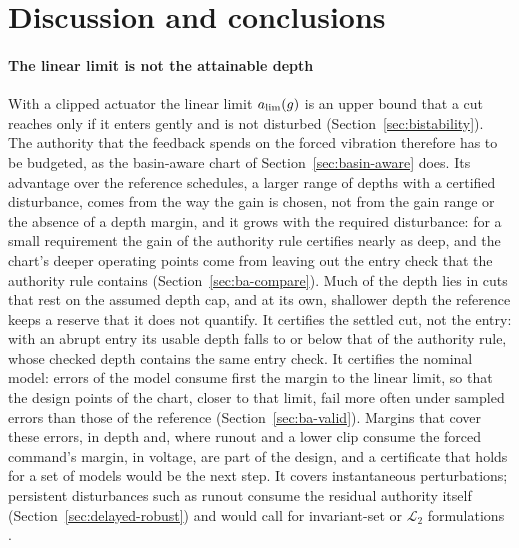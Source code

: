 \section{Discussion and conclusions}\label{sec:discussion}

\paragraph{The linear limit is not the attainable depth}
With a clipped actuator the linear limit $a_{\lim}(g)$ is an upper bound that a cut reaches only if it enters gently and is not disturbed (Section~\ref{sec:bistability}). The authority that the feedback spends on the forced vibration therefore has to be budgeted, as the basin-aware chart of Section~\ref{sec:basin-aware} does. Its advantage over the reference schedules, a larger range of depths with a certified disturbance, comes from the way the gain is chosen, not from the gain range or the absence of a depth margin, and it grows with the required disturbance: for a small requirement the gain of the authority rule certifies nearly as deep, and the chart's deeper operating points come from leaving out the entry check that the authority rule contains (Section~\ref{sec:ba-compare}). Much of the depth lies in cuts that rest on the assumed depth cap, and at its own, shallower depth the reference keeps a reserve that it does not quantify. It certifies the settled cut, not the entry: with an abrupt entry its usable depth falls to or below that of the authority rule, whose checked depth contains the same entry check. It certifies the nominal model: errors of the model consume first the margin to the linear limit, so that the design points of the chart, closer to that limit, fail more often under sampled errors than those of the reference (Section~\ref{sec:ba-valid}). Margins that cover these errors, in depth and, where runout and a lower clip consume the forced command's margin, in voltage, are part of the design, and a certificate that holds for a set of models would be the next step. It covers instantaneous perturbations; persistent disturbances such as runout consume the residual authority itself (Section~\ref{sec:delayed-robust}) and would call for invariant-set or $\mathcal L_2$ formulations \citep{hu2002disturbance,fang2004l2}.

